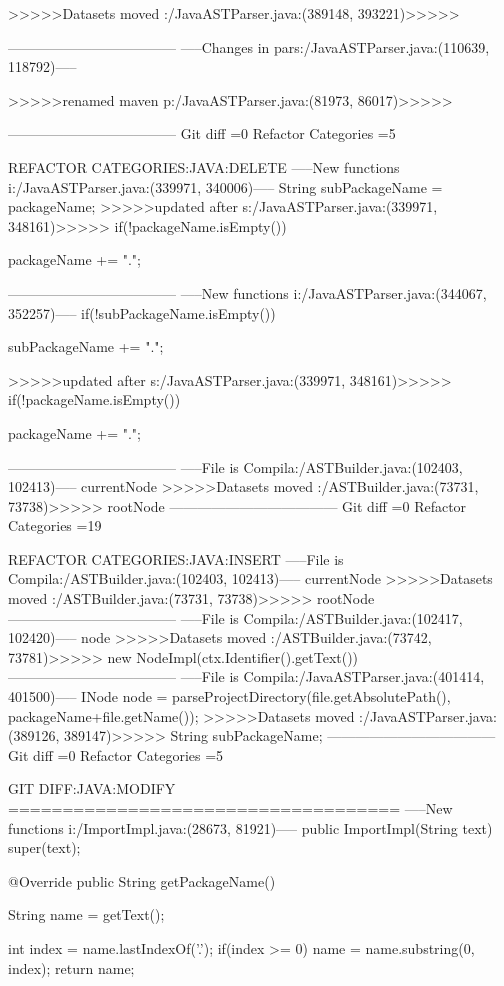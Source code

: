 {{{{{{{{{{{	
>>>>>Datasets moved :/JavaASTParser.java:(389148, 393221)>>>>>

					
------------------------------------
-----Changes in pars:/JavaASTParser.java:(110639, 118792)-----


        
>>>>>renamed maven p:/JavaASTParser.java:(81973, 86017)>>>>>

 
------------------------------------
Git diff =0  Refactor Categories =5

REFACTOR CATEGORIES:JAVA:DELETE
-----New functions i:/JavaASTParser.java:(339971, 340006)-----
String subPackageName = packageName;
>>>>>updated after s:/JavaASTParser.java:(339971, 348161)>>>>>
if(!packageName.isEmpty()){
			packageName += ".";
	
------------------------------------
-----New functions i:/JavaASTParser.java:(344067, 352257)-----
if(!subPackageName.isEmpty()){
			subPackageName += ".";
	
>>>>>updated after s:/JavaASTParser.java:(339971, 348161)>>>>>
if(!packageName.isEmpty()){
			packageName += ".";
	
------------------------------------
-----File is Compila:/ASTBuilder.java:(102403, 102413)-----
currentNode
>>>>>Datasets moved :/ASTBuilder.java:(73731, 73738)>>>>>
rootNode
------------------------------------
Git diff =0  Refactor Categories =19

REFACTOR CATEGORIES:JAVA:INSERT
-----File is Compila:/ASTBuilder.java:(102403, 102413)-----
currentNode
>>>>>Datasets moved :/ASTBuilder.java:(73731, 73738)>>>>>
rootNode
------------------------------------
-----File is Compila:/ASTBuilder.java:(102417, 102420)-----
node
>>>>>Datasets moved :/ASTBuilder.java:(73742, 73781)>>>>>
new NodeImpl(ctx.Identifier().getText())
------------------------------------
-----File is Compila:/JavaASTParser.java:(401414, 401500)-----
INode node = parseProjectDirectory(file.getAbsolutePath(), packageName+file.getName());
>>>>>Datasets moved :/JavaASTParser.java:(389126, 389147)>>>>>
String subPackageName;
------------------------------------
Git diff =0  Refactor Categories =5

GIT DIFF:JAVA:MODIFY
====================================
-----New functions i:/ImportImpl.java:(28673, 81921)-----
	public ImportImpl(String text) {
		super(text);
	}

	@Override
	public String getPackageName() {
		String name = getText();
		
		int index = name.lastIndexOf('.');
		if(index >= 0){
			name = name.substring(0, index);
		}
		return name;
	
}}}}}}}}}}}}}}}
